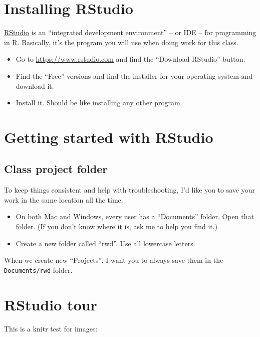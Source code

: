 \documentclass[]{book}
\providecommand{\tightlist}{%
  \setlength{\itemsep}{0pt}\setlength{\parskip}{0pt}}
\begin{document}
\section{Installing RStudio}\label{installing-rstudio}

\href{https://www.rstudio.com/}{RStudio} is an ``integrated development
environment'' -- or IDE -- for programming in R. Basically, it's the
program you will use when doing work for this class.

\begin{itemize}
\tightlist
\item
  Go to \url{https://www.rstudio.com} and find the ``Download RStudio''
  button.
\item
  Find the ``Free'' versions and find the installer for your operating
  system and download it.
\item
  Install it. Should be like installing any other program.
\end{itemize}

\section{Getting started with
RStudio}\label{getting-started-with-rstudio}

\subsection{Class project folder}\label{class-project-folder}

To keep things consistent and help with troubleshooting, I'd like you to
save your work in the same location all the time.

\begin{itemize}
\tightlist
\item
  On both Mac and Windows, every user has a ``Documents'' folder. Open
  that folder. (If you don't know where it is, ask me to help you find
  it.)
\item
  Create a new folder called ``rwd''. Use all lowercase letters.
\end{itemize}

When we create new ``Projects'', I want you to always save them in the
\texttt{Documents/rwd} folder.

\section{RStudio tour}\label{rstudio-tour}

This is a knitr test for images:
\end{document}
